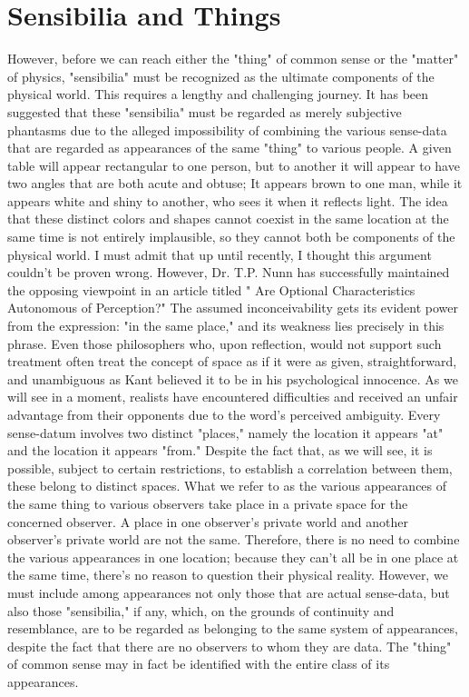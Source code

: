 \documentclass[a4paper,12pt]{book}[2004/02/16]
\theoremstyle{ilemma}
\theoremstyle{itheorem}
\theoremstyle{iother}
\theoremstyle{icorollary}
\theoremstyle{numcorollary}
\theoremstyle{idefinition}
\begin{document}
\section{Sensibilia and Things}
However, before we can reach either the "thing" of common sense or the "matter" of physics, "sensibilia" must be recognized as the ultimate components of the physical world. This requires a lengthy and challenging journey. It has been suggested that these "sensibilia" must be regarded as merely subjective phantasms due to the alleged impossibility of combining the various sense-data that are regarded as appearances of the same "thing" to various people. A given table will appear rectangular to one person, but to another it will appear to have two angles that are both acute and obtuse; It appears brown to one man, while it appears white and shiny to another, who sees it when it reflects light. The idea that these distinct colors and shapes cannot coexist in the same location at the same time is not entirely implausible, so they cannot both be components of the physical world. I must admit that up until recently, I thought this argument couldn't be proven wrong. However, Dr. T.P. Nunn has successfully maintained the opposing viewpoint in an article titled " Are Optional Characteristics Autonomous of Perception?" The
assumed inconceivability gets its evident power from the expression:
"in the same place," and its weakness lies precisely in this phrase. Even those philosophers who, upon reflection, would not support such treatment often treat the concept of space as if it were as given, straightforward, and unambiguous as Kant believed it to be in his psychological innocence. As we will see in a moment, realists have encountered difficulties and received an unfair advantage from their opponents due to the word's perceived ambiguity. Every sense-datum involves two distinct "places," namely the location it appears "at" and the location it appears "from." Despite the fact that, as we will see, it is possible, subject to certain restrictions, to establish a correlation between them, these belong to distinct spaces. What we refer to as the various appearances of the same thing to various observers take place in a private space for the concerned observer. A place in one observer's private world and another observer's private world are not the same. Therefore, there is no need to combine the various appearances in one location; because they can't all be in one place at the same time, there's no reason to question their physical reality. However, we must include among appearances not only those that are actual sense-data, but also those "sensibilia," if any, which, on the grounds of continuity and resemblance, are to be regarded as belonging to the same system of appearances, despite the fact that there are no observers to whom they are data. The "thing" of common sense may in fact be identified with the entire class of its appearances.
\end{document}

